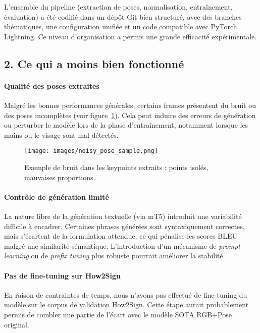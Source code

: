 L’ensemble du pipeline (extraction de poses, normalisation, entraînement, évaluation) a été codifié dans un dépôt Git bien structuré, avec des branches thématiques, une configuration unifiée et un code compatible avec PyTorch Lightning. Ce niveau d’organisation a permis une grande efficacité expérimentale.

\subsection*{2. Ce qui a moins bien fonctionné}

\paragraph{Qualité des poses extraites}

Malgré les bonnes performances générales, certains frames présentent du bruit ou des poses incomplètes (voir figure~\ref{fig:noisy_pose}). Cela peut induire des erreurs de génération ou perturber le modèle lors de la phase d’entraînement, notamment lorsque les mains ou le visage sont mal détectés.

\begin{figure}[h]
    \centering
    \texttt{[image: images/noisy\_pose\_sample.png]}
    \caption{Exemple de bruit dans les keypoints extraits : points isolés, mauvaises proportions.}
    \label{fig:noisy_pose}
\end{figure}

\paragraph{Contrôle de génération limité}

La nature libre de la génération textuelle (via mT5) introduit une variabilité difficile à encadrer. Certaines phrases générées sont syntaxiquement correctes, mais s’écartent de la formulation attendue, ce qui pénalise les scores BLEU malgré une similarité sémantique. L’introduction d’un mécanisme de \textit{prompt learning} ou de \textit{prefix tuning} plus robuste pourrait améliorer la stabilité.

\paragraph{Pas de fine-tuning sur How2Sign}

En raison de contraintes de temps, nous n’avons pas effectué de fine-tuning du modèle sur le corpus de validation How2Sign. Cette étape aurait probablement permis de combler une partie de l’écart avec le modèle SOTA RGB+Pose original.

